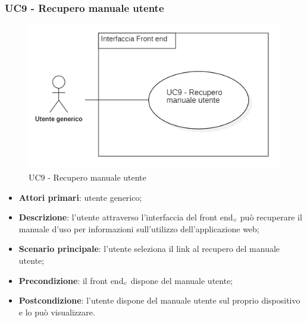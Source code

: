 \subsubsection{UC9 - Recupero manuale utente}\label{recuperoManualeUtente}
\begin{center}
	\begin{figure}[H]
		\includegraphics[scale=0.7]{../immagini/attori_casi/uc9.png}
		\caption{UC9 - Recupero manuale utente}
	\end{figure}
\end{center}
\begin{itemize}
	\item \textbf{Attori primari}: utente generico;
	\item \textbf{Descrizione}: l'utente attraverso l'interfaccia del front end$_{\scaleto{G}{3pt}}$ può recuperare il manuale d'uso per informazioni sull'utilizzo dell'applicazione web;
	\item \textbf{Scenario principale}: l'utente seleziona il link al recupero del manuale utente;
	\item \textbf{Precondizione}: il front end$_{\scaleto{G}{3pt}}$ dispone del manuale utente;
	\item \textbf{Postcondizione}: l'utente dispone del manuale utente sul proprio dispositivo e lo può visualizzare. 
\end{itemize}
